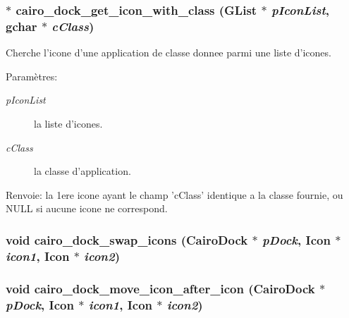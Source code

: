 \subsubsection{$\ast$ cairo\_\-dock\_\-get\_\-icon\_\-with\_\-class (GList $\ast$ {\em pIconList}, gchar $\ast$ {\em cClass})}\label{cairo-dock-icons_8h_03e5049b05266883f78ceea9622e5a98}


Cherche l'icone d'une application de classe donnee parmi une liste d'icones. \begin{Desc}
\item[Paramètres:]
\begin{description}
\item[{\em pIconList}]la liste d'icones. \item[{\em cClass}]la classe d'application. \end{description}
\end{Desc}
\begin{Desc}
\item[Renvoie:]la 1ere icone ayant le champ 'cClass' identique a la classe fournie, ou NULL si aucune icone ne correspond. \end{Desc}
\subsubsection{\setlength{\rightskip}{0pt plus 5cm}void cairo\_\-dock\_\-swap\_\-icons ({\bf CairoDock} $\ast$ {\em pDock}, {\bf Icon} $\ast$ {\em icon1}, {\bf Icon} $\ast$ {\em icon2})}\label{cairo-dock-icons_8h_c02977792baa2a21b716d1787ddb3d66}


\subsubsection{\setlength{\rightskip}{0pt plus 5cm}void cairo\_\-dock\_\-move\_\-icon\_\-after\_\-icon ({\bf CairoDock} $\ast$ {\em pDock}, {\bf Icon} $\ast$ {\em icon1}, {\bf Icon} $\ast$ {\em icon2})}\label{cairo-dock-icons_8h_b74f1ffc9f9fa74089e88fc6650632db}


